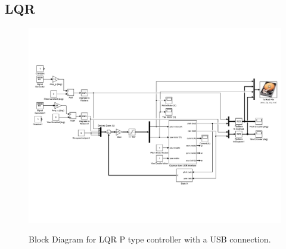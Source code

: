\subsection{LQR}
\begin{figure}[!htbp]
    \centering
    \includegraphics[width=.8\textwidth,keepaspectratio=true]{figs/img/LQR_USB}
    \label{fig:LQR_P_USB_Block_Diagram}
    \caption{Block Diagram for LQR P type controller with a USB connection.}
\end{figure}
